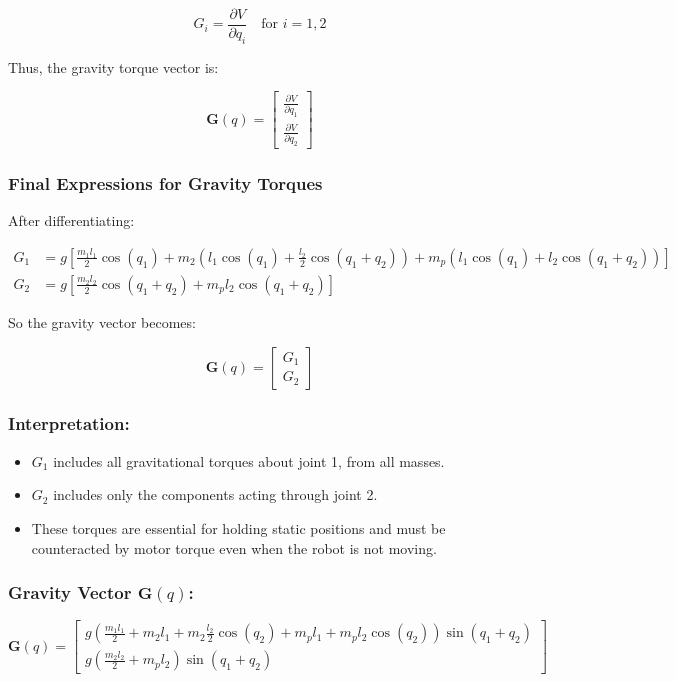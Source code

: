 \documentclass[a4paper,12pt]{article}
\begin{document}
\[
G_i = \frac{\partial V}{\partial q_i} \quad \text{for } i = 1, 2
\]

Thus, the gravity torque vector is:

\[
\mathbf{G}(q) =
\begin{bmatrix}
\frac{\partial V}{\partial q_1} \\
\frac{\partial V}{\partial q_2}
\end{bmatrix}
\]

\subsubsection*{Final Expressions for Gravity Torques}

After differentiating:

\begin{align*}
G_1 &= g \left[
\frac{m_1 l_1}{2} \cos(q_1) 
+ m_2 \left( l_1 \cos(q_1) + \frac{l_2}{2} \cos(q_1 + q_2) \right)
+ m_p \left( l_1 \cos(q_1) + l_2 \cos(q_1 + q_2) \right)
\right] \\
G_2 &= g \left[
\frac{m_2 l_2}{2} \cos(q_1 + q_2)
+ m_p l_2 \cos(q_1 + q_2)
\right]
\end{align*}

\noindent So the gravity vector becomes:

\[
\mathbf{G}(q) =
\begin{bmatrix}
G_1 \\
G_2
\end{bmatrix}
\]

\subsubsection*{Interpretation:}
\begin{itemize}
    \item $G_1$ includes all gravitational torques about joint 1, from all masses.
    \item $G_2$ includes only the components acting through joint 2.
    \item These torques are essential for holding static positions and must be counteracted by motor torque even when the robot is not moving.
\end{itemize}


\subsubsection*{Gravity Vector $\mathbf{G}(q)$:}

\[
\mathbf{G}(q) =
\begin{bmatrix}
g \left( \frac{m_1 l_1}{2} + m_2 l_1 + m_2 \frac{l_2}{2} \cos(q_2) + m_p l_1 + m_p l_2 \cos(q_2) \right) \sin(q_1 + q_2) \\
g \left( \frac{m_2 l_2}{2} + m_p l_2 \right) \sin(q_1 + q_2)
\end{bmatrix}
\]
\end{document}

